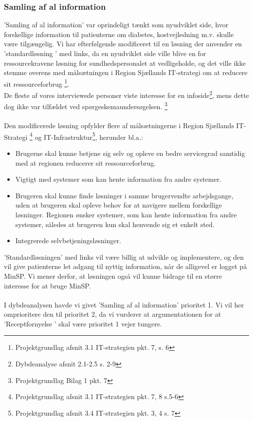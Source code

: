 \subsubsection{Samling af al information}
'Samling af al information' var oprindeligt tænkt som nyudviklet side, hvor forskellige information til patienterne om diabetes, kostvejledning m.v. skulle være tilgængelig. Vi har efterfølgende modificeret til en løsning der anvender en ’standardløsning ’ med links, da en nyudviklet side ville blive en for ressourcekravene løsning for sundhedspersonalet at vedligeholde, og det ville ikke stemme overens med målsætningen i Region Sjællands IT-strategi om at reducere sit ressourceforbrug \footnote{Projektgrundlag afsnit 3.1 IT-strategien pkt. 7, s. 6}.\\
De fleste af vores interviewede personer viste interesse for en infoside\footnote{Dybdeanalyse afsnit 2.1-2.5 s. 2-9}, mens dette dog ikke var tilfældet ved spørgeskemaundersøgelsen. \footnote{Projektgrundlag Bilag 1 pkt. 7}\\
\\
Den modificerede løsning opfylder flere af målsætningerne i Region Sjællands IT-Strategi \footnote{Projektgrundlag afsnit 3.1 IT-strategien pkt. 7, 8  s.5-6} og IT-Infrastruktur\footnote{Projektgrundlag afsnit 3.4 IT-strategien pkt. 3, 4 s. 7}, herunder bl.a.: 
\begin{itemize}
\item Brugerne skal kunne betjene sig selv og opleve en bedre servicegrad samtidig med at regionen reducerer sit ressourceforbrug.
\item Vigtigt med systemer som kan hente information fra andre systemer. 
\item Brugeren skal kunne finde løsninger i samme brugervendte arbejdsgange, uden at brugeren skal opleve behov for at navigere mellem forskellige løsninger. Regionen ønsker systemer, som kan hente information fra andre systemer, således at brugeren kun skal henvende sig et enkelt sted.
\item Integrerede selvbetjeningsløsninger.
\end{itemize}
'Standardløsningen' med links vil være billig at udvikle og implementere, og den vil give patienterne let adgang til nyttig information, når de alligevel er logget på MinSP. Vi mener derfor, at løsningen også vil kunne bidrage til en større interesse for at bruge MinSP.\\
\\
I dybdeanalysen havde vi givet ’Samling af al information’ prioritet 1. Vi vil her omprioritere den til prioritet 2, da vi vurderer at argumentationen for at ’Receptfornyelse ’ skal være prioritet 1 vejer tungere.
